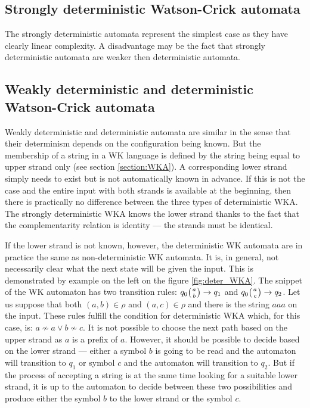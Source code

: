 \subsection{Strongly deterministic Watson-Crick automata}
The strongly deterministic automata represent the simplest case as they have clearly linear complexity. A disadvantage may be the fact that strongly deterministic automata are weaker then deterministic automata.

\subsection{Weakly deterministic and deterministic Watson-Crick automata}
Weakly deterministic and deterministic automata are similar in the sense that their determinism depends on the configuration being known. But the membership of a string in a WK language is defined by the string being equal to upper strand only (see section \ref{section:WKA}). A corresponding lower strand simply needs to exist but is not automatically known in advance. If this is not the case and the entire input with both strands is available at the beginning, then there is practically no difference between the three types of deterministic WKA. The strongly deterministic WKA knows the lower strand thanks to the fact that the complementarity relation is identity --- the strands must be identical.

If the lower strand is not known, however, the deterministic WK automata are in practice the same as non-deterministic WK automata. It is, in general, not necessarily clear what the next state will be given the input. This is demonstrated by example on the left on the figure \ref{fig:deter_WKA}. The snippet of the WK automaton has two transition rules: $q_0 \wkpair{a}{b} \rightarrow q_1$ and $q_0 \wkpair{a}{c} \rightarrow q_2$. Let us suppose that both $(a, b) \in \rho$ and $(a, c) \in \rho$ and there is the string $aaa$ on the input. These rules fulfill the condition for deterministic WKA which, for this case, is: $a \nsim a \vee b \nsim c$. It is not possible to choose the next path based on the upper strand as $a$ is a prefix of $a$. However, it should be possible to decide based on the lower strand --- either a symbol $b$ is going to be read and the automaton will transition to $q_1$ or symbol $c$ and the automaton will transition to $q_2$. But if the process of accepting a string is at the same time looking for a suitable lower strand, it is up to the automaton to decide between these two possibilities and produce either the symbol $b$ to the lower strand or the symbol $c$.

